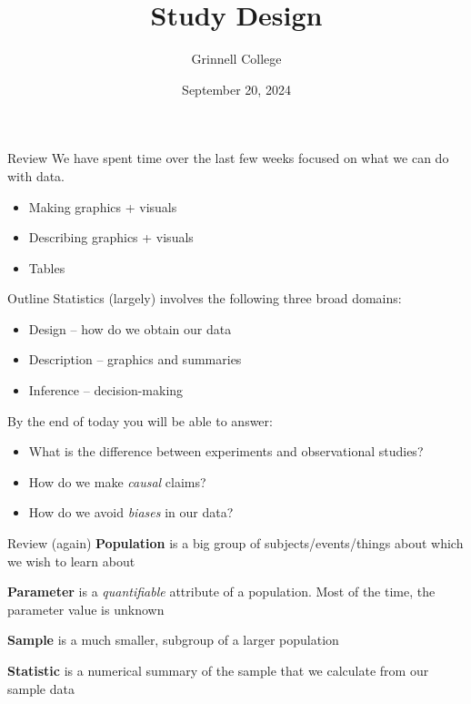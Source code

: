 \documentclass{beamer}
\title[SST-115 / STA-209]{Study Design}
\subtitle{}
\author{Grinnell College}
\date{September 20, 2024}
\begin{document}
\begin{frame}
  \titlepage
\end{frame}



\begin{frame}{Review}
We have spent time over the last few weeks focused on what we can do with data.
\begin{itemize}
    \item Making graphics + visuals
    \item Describing graphics + visuals
    \item Tables
\end{itemize}
\end{frame}

\begin{frame}{Outline}
Statistics (largely) involves the following three broad domains:
\begin{itemize}
    \item Design -- how do we obtain our data
    \item Description -- graphics and summaries
    \item Inference -- decision-making
\end{itemize} \vspace{4mm}

By the end of today you will be able to answer:
\begin{itemize}
    \item What is the difference between experiments and observational studies?
    \item How do we make \textit{causal} claims?
    \item How do we avoid \textit{biases} in our data?
\end{itemize}
\end{frame}



\begin{frame}{Review (again)}
\textbf{Population} is a big group of subjects/events/things about which we wish to learn about \vspace{4mm}

\textbf{Parameter} is a \textit{quantifiable} attribute of a population. Most of the time, the parameter value is unknown \vspace{10mm}

\textbf{Sample} is a much smaller, subgroup of a larger population \vspace{4mm}

\textbf{Statistic} is a numerical summary of the sample that we calculate from our sample data
\end{frame}
\end{document}
